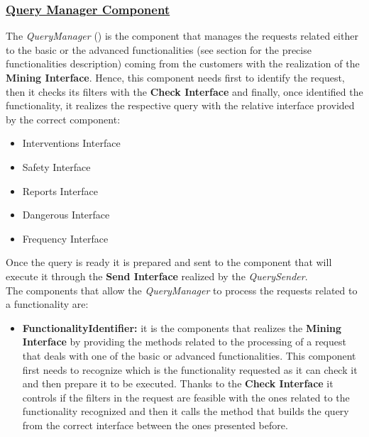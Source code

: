 		\subsubsection[Query Manager Component]{\hyperlink{toc}{Query Manager Component}}
			\label{sec:queryManagerComponent}
			
			The \emph{QueryManager} () is the component that manages the requests related either to the basic or the advanced functionalities (see section  for the precise functionalities description) coming from the customers with the realization of the \textbf{Mining Interface}. Hence, this component needs first to identify the request, then it checks its filters with the \textbf{Check Interface} and finally, once identified the functionality, it realizes the respective query with the relative interface provided by the correct component:
			
			\begin{itemize}
				\item Interventions Interface
				\item Safety Interface
				\item Reports Interface
				\item Dangerous Interface
				\item Frequency Interface
			\end{itemize}
		
			Once the query is ready it is prepared and sent to the component that will execute it through the \textbf{Send Interface} realized by the \emph{QuerySender}.\\
			
			The components that allow the \emph{QueryManager} to process the requests related to a functionality are:
			
			\begin{itemize}
				\item \textbf{FunctionalityIdentifier:} it is the components that realizes the \textbf{Mining Interface} by providing the methods related to the processing of a request that deals with one of the basic or advanced functionalities. This component first needs to recognize which is the functionality requested as it can check it and then prepare it to be executed. Thanks to the \textbf{Check Interface} it controls if the filters in the request are feasible with the ones related to the functionality recognized and then it calls the method that builds the query from the correct interface between the ones presented before.
			\end{itemize}
			
